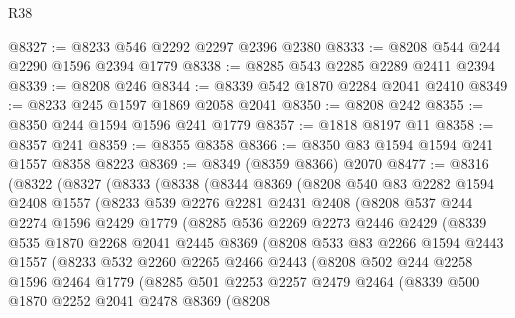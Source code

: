 \begin{lexlean}{R38}
\begin{coremodule}
@8327 := @8233 @546 @2292 @2297 @2396 @2380
@8333 := @8208 @544 @244 @2290 @1596 @2394 @1779
@8338 := @8285 @543 @2285 @2289 @2411 @2394
@8339 := @8208 @246
@8344 := @8339 @542 @1870 @2284 @2041 @2410
@8349 := @8233 @245 @1597 @1869 @2058 @2041
@8350 := @8208 @242
@8355 := @8350 @244 @1594 @1596 @241 @1779
@8357 := @1818 @8197 @11
@8358 := @8357 @241
@8359 := @8355 @8358
@8366 := @8350 @83 @1594 @1594 @241 @1557 @8358 @8223
@8369 := @8349 (@8359 @8366) @2070
@8477 := @8316
    (@8322
      (@8327
        (@8333
          (@8338
            (@8344
              @8369
              (@8208
                @540
                @83
                @2282
                @1594
                @2408
                @1557
                (@8233
                  @539
                  @2276
                  @2281
                  @2431
                  @2408
                  (@8208
                    @537
                    @244
                    @2274
                    @1596
                    @2429
                    @1779
                    (@8285
                      @536
                      @2269
                      @2273
                      @2446
                      @2429
                      (@8339
                        @535
                        @1870
                        @2268
                        @2041
                        @2445
                        @8369
                        (@8208
                          @533
                          @83
                          @2266
                          @1594
                          @2443
                          @1557
                          (@8233
                            @532
                            @2260
                            @2265
                            @2466
                            @2443
                            (@8208
                              @502
                              @244
                              @2258
                              @1596
                              @2464
                              @1779
                              (@8285
                                @501
                                @2253
                                @2257
                                @2479
                                @2464
                                (@8339
                                  @500
                                  @1870
                                  @2252
                                  @2041
                                  @2478
                                  @8369
                                  (@8208

\end{coremodule}
\end{lexlean}
